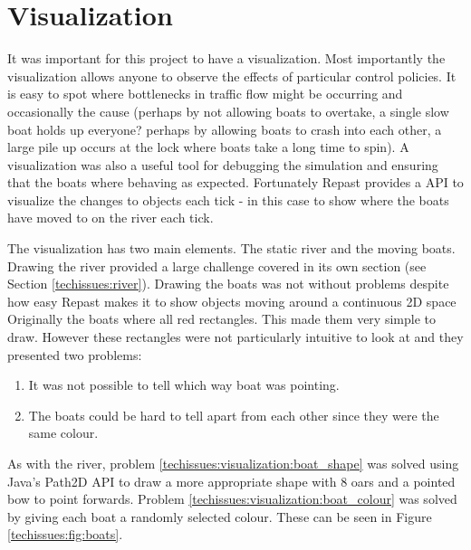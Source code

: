     \section{Visualization}
      It was important for this project to have a visualization. Most importantly the visualization allows anyone to observe the effects of particular control policies. It is easy to spot where bottlenecks in traffic flow might be occurring and occasionally the cause (perhaps by not allowing boats to overtake, a single slow boat holds up everyone? perhaps by allowing boats to crash into each other, a large pile up occurs at the lock where boats take a long time to spin). A visualization was also a useful tool for debugging the simulation and ensuring that the boats where behaving as expected. Fortunately Repast provides a API to visualize the changes to objects each tick - in this case to show where the boats have moved to on the river each tick.

      The visualization has two main elements. The static river and the moving boats. Drawing the river provided a large challenge covered in its own section (see Section \ref{techissues:river}). Drawing the boats was not without problems despite how easy Repast makes it to show objects moving around a continuous 2D space Originally the boats where all red rectangles. This made them very simple to draw. However these rectangles were not particularly intuitive to look at and they presented two problems:
      \begin{enumerate}
        \item \label{techissues:visualization:boat_shape} It was not possible to tell which way boat was pointing.
        \item \label{techissues:visualization:boat_colour} The boats could be hard to tell apart from each other since they were the same colour. 
      \end{enumerate}
      As with the river, problem \ref{techissues:visualization:boat_shape} was solved using Java's Path2D API to draw a more appropriate shape with 8 oars and a pointed bow to point forwards. Problem \ref{techissues:visualization:boat_colour} was solved by giving each boat a randomly selected colour. These can be seen in Figure \ref{techissues:fig:boats}.

